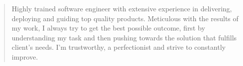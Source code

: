 \begin{quote}
    Highly trained software engineer with extensive experience in delivering, deploying and guiding top quality products. Meticulous with the results of my work, I always try to get the best possible outcome, first by understanding my task and then pushing towards the solution that fulfills client's needs. I'm trustworthy, a perfectionist and strive to constantly improve.
\end{quote}